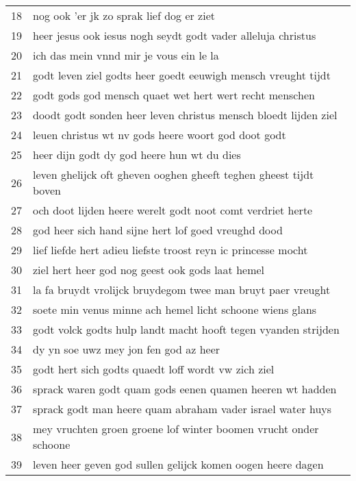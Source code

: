\begin{longtable}{p{} | p{}}
	18    & nog ook 'er jk zo sprak lief dog er ziet                             \\
	19    & heer jesus ook iesus nogh seydt godt vader alleluja christus         \\
	20    & ich das mein vnnd mir je vous ein le la                              \\
	21    & godt leven ziel godts heer goedt eeuwigh mensch vreught tijdt        \\
	22    & godt gods god mensch quaet wet hert wert recht menschen              \\
	23    & doodt godt sonden heer leven christus mensch bloedt lijden ziel      \\
	24    & leuen christus wt nv gods heere woort god doot godt                  \\
	25    & heer dijn godt dy god heere hun wt du dies                           \\
	26    & leven ghelijck oft gheven ooghen gheeft teghen gheest tijdt boven    \\
	27    & och doot lijden heere werelt godt noot comt verdriet herte           \\
	28    & god heer sich hand sijne hert lof goed vreughd dood                  \\
	29    & lief liefde hert adieu liefste troost reyn ic princesse mocht        \\
	30    & ziel hert heer god nog geest ook gods laat hemel                     \\
	31    & la fa bruydt vrolijck bruydegom twee man bruyt paer vreught          \\
	32    & soete min venus minne ach hemel licht schoone wiens glans            \\
	33    & godt volck godts hulp landt macht hooft tegen vyanden strijden       \\
	34    & dy yn soe uwz mey jon fen god az heer                                \\
	35    & godt hert sich godts quaedt loff wordt vw zich ziel                  \\
	36    & sprack waren godt quam gods eenen quamen heeren wt hadden            \\
	37    & sprack godt man heere quam abraham vader israel water huys           \\
	38    & mey vruchten groen groene lof winter boomen vrucht onder schoone     \\
	39    & leven heer geven god sullen gelijck komen oogen heere dagen          \\

\end{longtable}
